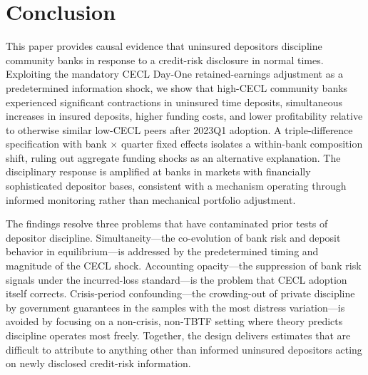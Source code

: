 
\section{Conclusion}
\label{sec:conclusion}

This paper provides causal evidence that uninsured depositors discipline community
banks in response to a credit-risk disclosure in normal times.  Exploiting the
mandatory CECL Day-One retained-earnings adjustment as a predetermined information
shock, we show that high-CECL community banks experienced significant contractions
in uninsured time deposits, simultaneous increases in insured deposits, higher
funding costs, and lower profitability relative to otherwise similar low-CECL
peers after 2023Q1 adoption.  A triple-difference specification with bank
$\times$ quarter fixed effects isolates a within-bank composition shift, ruling
out aggregate funding shocks as an alternative explanation.  The disciplinary
response is amplified at banks in markets with financially sophisticated depositor
bases, consistent with a mechanism operating through informed monitoring rather
than mechanical portfolio adjustment.

The findings resolve three problems that have contaminated prior tests of
depositor discipline.  Simultaneity---the co-evolution of bank risk and deposit
behavior in equilibrium---is addressed by the predetermined timing and magnitude
of the CECL shock.  Accounting opacity---the suppression of bank risk signals
under the incurred-loss standard---is the problem that CECL adoption itself
corrects.  Crisis-period confounding---the crowding-out of private discipline by
government guarantees in the samples with the most distress variation---is avoided
by focusing on a non-crisis, non-TBTF setting where theory predicts discipline
operates most freely.  Together, the design delivers estimates that are difficult
to attribute to anything other than informed uninsured depositors acting on newly
disclosed credit-risk information.

